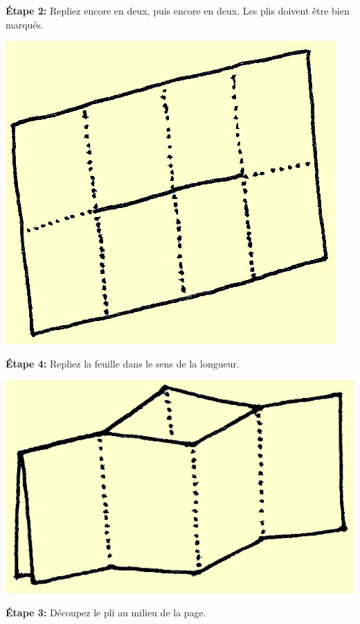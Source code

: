 \documentclass[a4paper,12pt]{article}
\begin{document}
\noindent
\begin{minipage}[b]{.45\linewidth}
\medskip
\noindent\textbf{Étape 2:} Repliez encore en deux, puis encore en deux.  Les plis doivent être
bien marqués.

\medskip \centerline{\includegraphics{img/ptitlivre-etape2.jpg}}

\medskip
\noindent\textbf{Étape 4:} Repliez la feuille dans le sens de la longueur.\\

  \centerline{\includegraphics{img/ptitlivre-etape4.jpg}}

\end{minipage}\hfill\begin{minipage}[b]{.45\linewidth}
\noindent\textbf{Étape 3:} Découpez le pli au milieu de la page.


\end{minipage}
\end{document}
